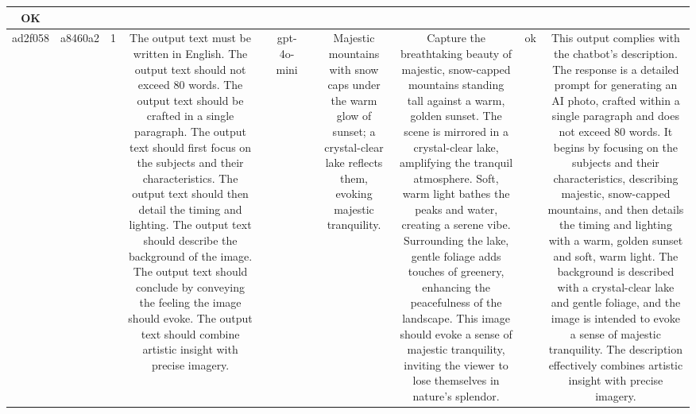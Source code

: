 \begin{table}[h!]
\begin{tabular}{|c|c|c|c|c|c|c|c|c|c|c|}
OK\\
\hline
ad2f058 & a8460a2 & 1 & The output text must be written in English. The output text should not exceed 80 words. The output text should be crafted in a single paragraph. The output text should first focus on the subjects and their characteristics. The output text should then detail the timing and lighting. The output text should describe the background of the image. The output text should conclude by conveying the feeling the image should evoke. The output text should combine artistic insight with precise imagery. &  & gpt-4o-mini &  & Majestic mountains with snow caps under the warm glow of sunset; a crystal-clear lake reflects them, evoking majestic tranquility. & Capture the breathtaking beauty of majestic, snow-capped mountains standing tall against a warm, golden sunset. The scene is mirrored in a crystal-clear lake, amplifying the tranquil atmosphere. Soft, warm light bathes the peaks and water, creating a serene vibe. Surrounding the lake, gentle foliage adds touches of greenery, enhancing the peacefulness of the landscape. This image should evoke a sense of majestic tranquility, inviting the viewer to lose themselves in nature's splendor. & ok & This output complies with the chatbot's description. The response is a detailed prompt for generating an AI photo, crafted within a single paragraph and does not exceed 80 words. It begins by focusing on the subjects and their characteristics, describing majestic, snow-capped mountains, and then details the timing and lighting with a warm, golden sunset and soft, warm light. The background is described with a crystal-clear lake and gentle foliage, and the image is intended to evoke a sense of majestic tranquility. The description effectively combines artistic insight with precise imagery.


\end{tabular}
\end{table}
